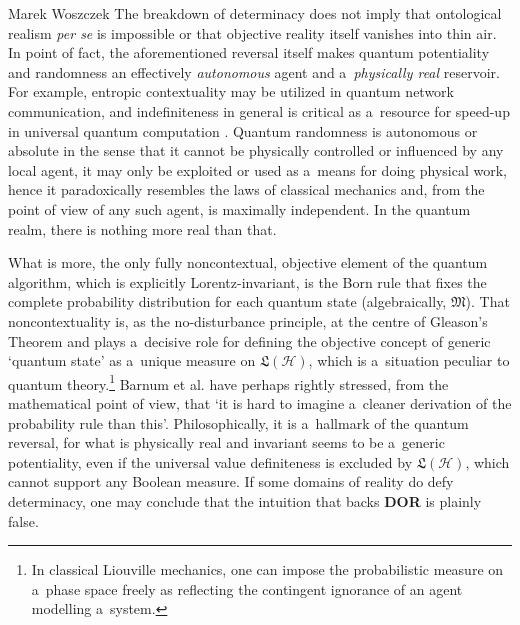 \begin{artengenv}{Marek Woszczek}
The breakdown of determinacy does not imply that ontological realism \textit{per se} is impossible or that objective reality itself vanishes into thin air. In point of fact, the aforementioned reversal itself makes quantum potentiality and randomness an effectively \textit{autonomous} agent and a~\textit{physically real} reservoir. For example, entropic contextuality may be utilized in quantum network communication, and indefiniteness in general is critical as a~resource for speed-up in universal quantum computation
\parencite[][]{howard_contextuality_2014}. %
 Quantum randomness is autonomous or absolute in the sense that it cannot be physically controlled or influenced by any local agent, it may only be exploited or used as a~means for doing physical work, hence it paradoxically resembles the laws of classical mechanics and, from the point of view of any such agent, is maximally independent. In the quantum realm, there is nothing more real than that.

What is more, the only fully noncontextual, objective element of the quantum algorithm, which is explicitly Lorentz-invariant, is the Born rule that fixes the complete probability distribution for each quantum state (algebraically, $\bm{\mathfrak{M}}$). That noncontextuality is, as the no-disturbance principle, at the centre of Gleason's Theorem and plays a~decisive role for defining the objective concept of generic ‘quantum state' as a~unique measure on $\bm{\mathfrak{L}(\mathcal{H})}$, which is a~situation peculiar to quantum theory.\footnote{In classical Liouville mechanics, one can impose the probabilistic measure on a~phase space freely as reflecting the contingent ignorance of an agent modelling a~system.} Barnum et al.
\parencite*[][]{bruss_approximate_2000} %
 have perhaps rightly stressed, from the mathematical point of view, that ‘it is hard to imagine a~cleaner derivation of the probability rule than this'. Philosophically, it is a~hallmark of the quantum reversal, for what is physically real and invariant seems to be a~generic potentiality, even if the universal value definiteness is excluded by $\bm{\mathfrak{L}(\mathcal{H})}$, which cannot support any Boolean measure. If some domains of reality do defy determinacy, one may conclude that the intuition that backs \textbf{DOR} is plainly false.


\end{artengenv}
